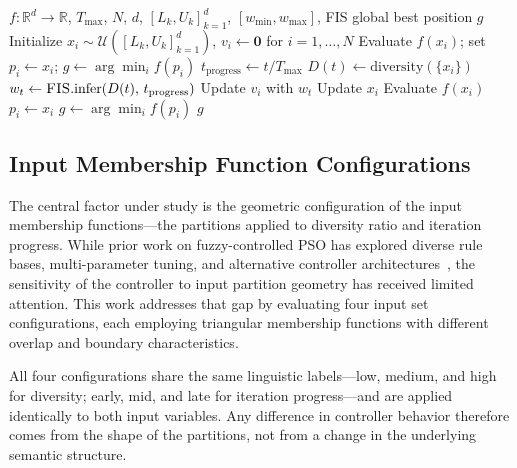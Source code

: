 \documentclass[conference]{IEEEtran}
\begin{document}
{\color{red}
\begin{algorithm}[ht]
\caption{Fuzzy-Controlled PSO (FCS--PSO)}
\label{alg:fcs_pso}
\small
\begin{algorithmic}[1]
\Require $f\colon\mathbb{R}^d\to\mathbb{R}$, $T_{\max}$, $N$, $d$, $[L_k,U_k]_{k=1}^{d}$, $[w_{\min}, w_{\max}]$, FIS
\Ensure global best position $g$
\State Initialize $x_i \sim \mathcal{U}([L_k,U_k]_{k=1}^d)$, $v_i \gets \mathbf{0}$ for $i = 1, \dots, N$
\State Evaluate $f(x_i)$; set $p_i \gets x_i$; $g \gets \arg\min_i f(p_i)$
    \State $t_{\text{progress}} \gets t / T_{\max}$ 
    \State $D(t) \gets \text{diversity}(\{x_i\})$ 
    \State $w_t \gets \textsc{FIS}.\text{infer}(D(t),\, t_{\text{progress}})$ 
        \State Update $v_i$ with $w_t$ 
        \State Update $x_i$ 
        \State Evaluate $f(x_i)$
         $p_i \gets x_i$ \EndIf
    \EndFor
    \State $g \gets \arg\min_i f(p_i)$
\EndFor
\State \Return $g$
\end{algorithmic}
\end{algorithm}
}

\subsection{Input Membership Function Configurations}
\label{subsec:input_mf_configs}

The central factor under study is the geometric configuration of the input membership functions---the partitions applied to diversity ratio and iteration progress. While prior work on fuzzy-controlled PSO has explored diverse rule bases, multi-parameter tuning, and alternative controller architectures~\cite{shi2001fuzzy, nobile2018fuzzy, xia2022particle}, the sensitivity of the controller to input partition geometry has received limited attention. This work addresses that gap by evaluating four input set configurations, each employing triangular membership functions with different overlap and boundary characteristics.

All four configurations share the same linguistic labels---low, medium, and high for diversity; early, mid, and late for iteration progress---and are applied identically to both input variables. Any difference in controller behavior therefore comes from the shape of the partitions, not from a change in the underlying semantic structure.
\end{document}
